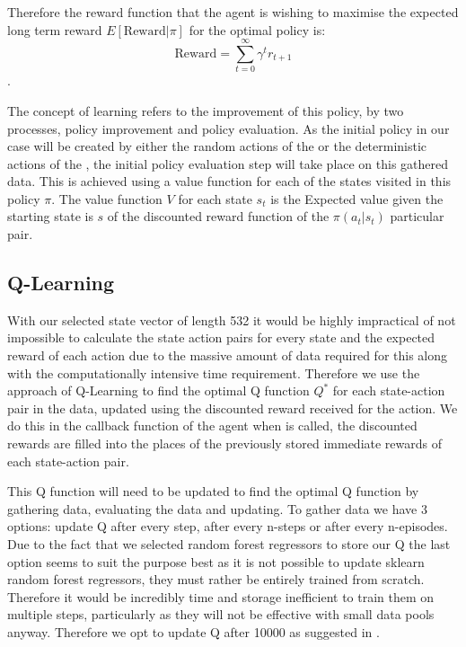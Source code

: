 Therefore the reward function that the agent is wishing to maximise the expected long term reward $E[\text{Reward}|\pi]$ for the optimal policy is: $$\text{Reward} = \sum_{t=0}^{\infty} \gamma^t r_{t+1}$$. 

The concept of learning refers to the improvement of this policy, by two processes, policy improvement and policy evaluation. As the initial policy in our case will be created by either the random actions of the  or the deterministic actions of the , the initial policy evaluation step will take place on this gathered data.  This is achieved using a value function for each of the states visited in this policy $\pi$. The value function $V$ for each state $s_t$ is the Expected value given the starting state is $s$ of the discounted reward function of the $\pi(a_t|s_t)$ particular pair.

	\subsection{Q-Learning}
	With our selected state vector of length 532 it would be highly impractical of not impossible to calculate the state action pairs for every state and the expected reward of each action due to the massive amount of data required for this along with the computationally intensive time requirement. Therefore we use the approach of Q-Learning to find the optimal Q function $Q^*$ for each state-action pair in the data, updated using the discounted reward received for the action. We do this in the callback function of the agent when  is called, the discounted rewards are filled into the places of the previously stored immediate rewards of each state-action pair. 
	
	This Q function will need to be updated to find the optimal Q function by gathering data, evaluating the data and updating. To gather data we have 3 options: update Q after every step, after every n-steps or after every n-episodes. Due to the fact that we selected random forest regressors to store our Q the last option seems to suit the purpose best as it is not possible to update sklearn random forest regressors, they must rather be entirely trained from scratch. Therefore it would be incredibly time and storage inefficient to train them on multiple steps, particularly as they will not be effective with small data pools anyway. Therefore we opt to update Q after 10000 as suggested in \cite{paper}.
	
